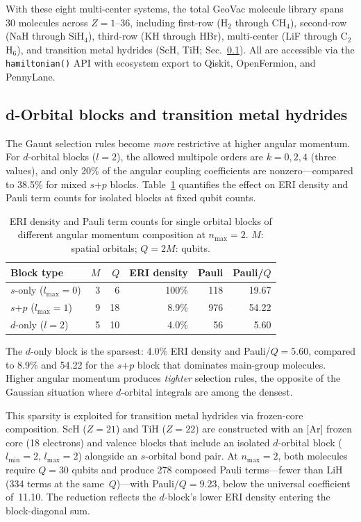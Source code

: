 \documentclass[aps,pra,twocolumn,superscriptaddress,longbibliography]{revtex4-2}
\begin{document}
With these eight multi-center systems, the total GeoVac molecule
library spans 30 molecules across $Z = 1$--36, including first-row
(H$_2$ through CH$_4$), second-row (NaH through SiH$_4$),
third-row (KH through HBr), multi-center (LiF through
C$_2$H$_6$), and transition metal hydrides (ScH, TiH;
Sec.~\ref{sec:d_orbitals}).  All are accessible via the
\texttt{hamiltonian()} API with ecosystem export to Qiskit,
OpenFermion, and PennyLane.


\subsection{d-Orbital blocks and transition metal hydrides}
\label{sec:d_orbitals}

The Gaunt selection rules become \emph{more} restrictive at higher
angular momentum.  For $d$-orbital blocks ($l = 2$), the allowed
multipole orders are $k = 0, 2, 4$ (three values), and only 20\% of
the angular coupling coefficients are nonzero---compared to 38.5\%
for mixed $s$+$p$ blocks.  Table~\ref{tab:d_block_eri} quantifies the
effect on ERI density and Pauli term counts for isolated blocks at
fixed qubit counts.

\begin{table}[t]
\caption{ERI density and Pauli term counts for single orbital blocks
  of different angular momentum composition at $n_{\max} = 2$.
  $M$: spatial orbitals; $Q = 2M$: qubits.}
\label{tab:d_block_eri}
\begin{ruledtabular}
\begin{tabular}{lrrrrr}
Block type & $M$ & $Q$ & ERI density & Pauli & Pauli/$Q$ \\
\hline
$s$-only ($l_{\max} = 0$) & 3 & 6 & 100\% & 118 & 19.67 \\
$s$+$p$ ($l_{\max} = 1$) & 9 & 18 & 8.9\% & 976 & 54.22 \\
$d$-only ($l = 2$) & 5 & 10 & 4.0\% & 56 & 5.60 \\
\end{tabular}
\end{ruledtabular}
\end{table}

The $d$-only block is the sparsest: 4.0\% ERI density and
Pauli/$Q = 5.60$, compared to 8.9\% and 54.22 for the $s$+$p$ block
that dominates main-group molecules.  Higher angular momentum produces
\emph{tighter} selection rules, the opposite of the Gaussian situation
where $d$-orbital integrals are among the densest.

This sparsity is exploited for transition metal hydrides via frozen-core
composition.  ScH ($Z = 21$) and TiH ($Z = 22$) are constructed with
an [Ar] frozen core (18 electrons) and valence blocks that include an
isolated $d$-orbital block ($l_{\min} = 2$, $l_{\max} = 2$) alongside
an $s$-orbital bond pair.  At $n_{\max} = 2$, both molecules require
$Q = 30$ qubits and produce 278 composed Pauli terms---fewer than
LiH (334 terms at the same~$Q$)---with Pauli/$Q = 9.23$, below the
universal coefficient of~11.10.  The reduction reflects the $d$-block's
lower ERI density entering the block-diagonal sum.
\end{document}
